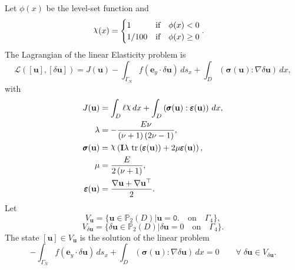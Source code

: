 \documentclass[preview]{standalone}
\let\oldcdot\cdot
\let\cdot\oldcdot
\begin{document}
Let $\phi(x)$ be the level-set function and
 \begin{align*}\raisebox{\depth}{$\chi$}(x) &= \begin{cases} 1 & \mbox{if}\quad \phi(x) < 0 \\ 1/100 & \mbox{if}\quad \phi(x)  \ge 0 \end{cases}.\end{align*}
The Lagrangian of the linear Elasticity problem is
\begin{dmath*}
\mathcal L(\left[ {\mathbf{ u }}\right],\left[ {\delta\mathbf{  u }}\right]) = J({\mathbf{ u }}) -  \int_{\Gamma_N} f \left( \mathbf e_y \cdot {\delta\mathbf{  u }} \right) \,ds_x +  \int_{D} \left( \pmb \sigma({\mathbf{ u }}) \mathrel{:}  \nabla {\delta\mathbf{  u }}  \right) \,dx , 
\end{dmath*}
with 
\begin{align*}
J({\mathbf{ u }}) &=  \int_{D} \ell \raisebox{\depth}{$\chi$} \,dx +  \int_{D} \left( \pmb \sigma({\mathbf{ u }}) \mathrel{:} \pmb \varepsilon({\mathbf{ u }}) \right) \,dx,\\
\lambda &= - \frac{E \nu}{\left(\nu + 1\right) \left(2 \nu - 1\right)},\\
\pmb \sigma({\mathbf{ u }}) &= \raisebox{\depth}{$\chi$} \left(\mathbf{I} \lambda  \,\operatorname{tr}\left(\pmb \varepsilon({\mathbf{ u }})\right)  + 2 \mu \pmb \varepsilon({\mathbf{ u }})\right),\\
\mu &= \frac{E}{2 \left(\nu + 1\right)},\\
\pmb \varepsilon({\mathbf{ u }}) &= \frac{ \nabla {\mathbf{ u }}  +   \nabla {\mathbf{ u }} ^\top }{2}.
 \end{align*}
Let
\begin{equation*}
V_{{\mathbf{ u }}} = \{ {\mathbf{ u }} \in \mathbb P_{2}(D)| {\mathbf{ u }} = \mathtt{\text{0.}}  \quad \text{{on}} \quad\Gamma_{4} \},\end{equation*}
\begin{equation*}
V_{{\delta\mathbf{  u }}} = \{ {\delta\mathbf{  u }} \in \mathbb P_{2}(D)| {\delta\mathbf{  u }} = 0  \quad \text{{on}} \quad\Gamma_{4} \}.\end{equation*}
The state $\left[ {\mathbf{ u }}\right] \in  V_{{\mathbf{ u }}}$ is the solution of the linear problem
\begin{dmath*}
-  \int_{\Gamma_N} f \left( \mathbf e_y \cdot {\delta\mathbf{  u }} \right) \,ds_x +  \int_{D} \left( \pmb \sigma({\mathbf{ u }}) \mathrel{:}  \nabla {\delta\mathbf{  u }}  \right) \,dx = 0\qquad \forall\; {{\delta\mathbf{  u }}\in V_{{\delta\mathbf{  u }}}} . 
\end{dmath*}
\end{document}
